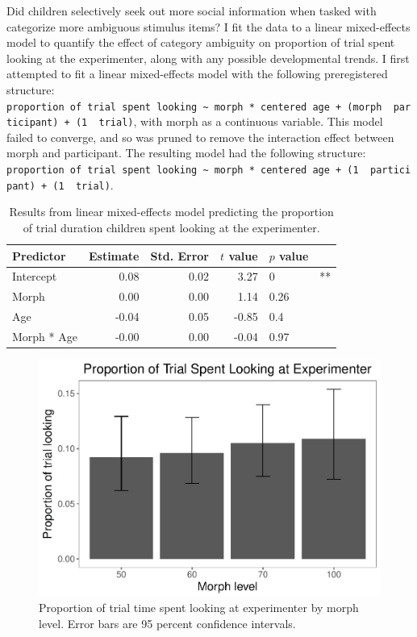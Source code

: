 \documentclass[floatsintext,man]{apa6}
\theoremstyle{definition}
\theoremstyle{definition}
\theoremstyle{definition}
\theoremstyle{remark}
\begin{document}
Did children selectively seek out more social information when tasked
with categorize more ambiguous stimulus items? I fit the data to a
linear mixed-effects model to quantify the effect of category ambiguity
on proportion of trial spent looking at the experimenter, along with any
possible developmental trends. I first attempted to fit a linear
mixed-effects model with the following preregistered structure:
\texttt{proportion\ of\ trial\ spent\ looking\ \textasciitilde{}\ morph\ *\ centered\ age\ +\ (morph\ \textbar{}\ participant)\ +\ (1\ \textbar{}\ trial)},
with morph as a continuous variable. This model failed to converge, and
so was pruned to remove the interaction effect between morph and
participant. The resulting model had the following structure:
\texttt{proportion\ of\ trial\ spent\ looking\ \textasciitilde{}\ morph\ *\ centered\ age\ +\ (1\ \textbar{}\ participant)\ +\ (1\ \textbar{}\ trial)}.

\begin{table}[ht]
\centering
\caption{Results from linear mixed-effects model predicting the proportion of trial duration children spent looking at the experimenter.} 
\begin{tabular}{lrrrll}
  \hline
Predictor & Estimate & Std. Error & $t$ value & $p$ value &   \\ 
  \hline
Intercept & 0.08 & 0.02 & 3.27 & 0 & ** \\ 
  Morph & 0.00 & 0.00 & 1.14 & 0.26 &  \\ 
  Age & -0.04 & 0.05 & -0.85 & 0.4 &  \\ 
  Morph * Age & -0.00 & 0.00 & -0.04 & 0.97 &  \\ 
   \hline
\end{tabular}
\end{table}

\begin{figure}
\centering
\includegraphics{soc_ref_category_paper_files/figure-latex/morphlooking-1.pdf}
\caption{\label{fig:morphlooking}Proportion of trial time spent looking at
experimenter by morph level. Error bars are 95 percent confidence
intervals.}
\end{figure}
\end{document}
